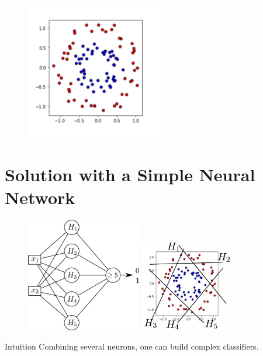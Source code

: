 \documentclass{book}
\begin{document}
\begin{figure}[h]
    \centering
    \includegraphics[height=6cm]{circles}
\end{figure}

\section{Solution with a Simple Neural Network}

\begin{figure}[h]
    \centering
    \begin{minipage}{.5\textwidth}
        \centering
        \includegraphics[height=5cm]{ann_5}
    \end{minipage}%
    \begin{minipage}{.5\textwidth}
        \centering
        \includegraphics[height=4cm]{circles_H}
    \end{minipage}
\end{figure}

\begin{myblock}{Intuition}
Combining several neurons, one can build complex classifiers.
\end{myblock}
\end{document}
